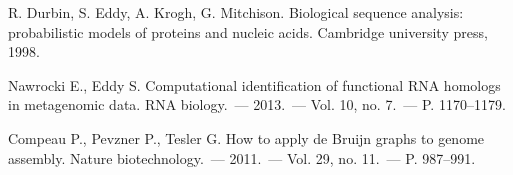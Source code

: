 \begin{thebibliography}{99}
  R. Durbin, S. Eddy, A. Krogh, G. Mitchison.
  Biological sequence analysis: probabilistic models of proteins and nucleic acids.
  Cambridge university press, 1998.

  Nawrocki E., Eddy S.
  Computational identification of functional RNA homologs in metagenomic data.
  RNA biology.~--- 2013.~--- Vol. 10, no. 7.~--- P. 1170–1179.

  Compeau P., Pevzner P., Tesler G. 
  How to apply de Bruijn graphs to genome assembly.
   Nature biotechnology.~--- 2011.~--- Vol. 29, no. 11.~--- P. 987–991.

\end{thebibliography}
